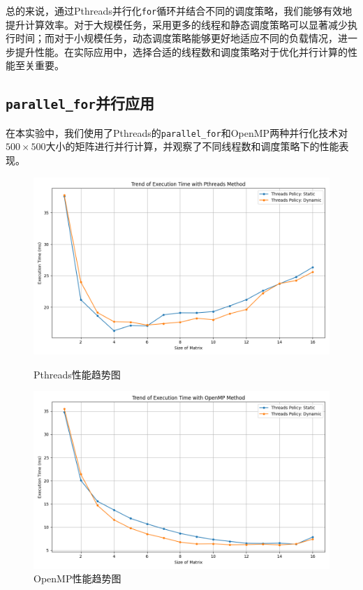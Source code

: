 \documentclass[a4paper, utf8]{ctexart}
\begin{document}
	总的来说，通过Pthreads并行化\verb|for|循环并结合不同的调度策略，我们能够有效地提升计算效率。对于大规模任务，采用更多的线程和静态调度策略可以显著减少执行时间；而对于小规模任务，动态调度策略能够更好地适应不同的负载情况，进一步提升性能。在实际应用中，选择合适的线程数和调度策略对于优化并行计算的性能至关重要。
	
	\subsection{\texttt{parallel\_for}并行应用}
	
	在本实验中，我们使用了Pthreads的\verb|parallel_for|和OpenMP两种并行化技术对$500\times500$大小的矩阵进行并行计算，并观察了不同线程数和调度策略下的性能表现。
	
	\begin{figure}[htbp]
		\centering
		\begin{minipage}{.45\textwidth}
			\centering
			\includegraphics[width=.8\textwidth]{./figure/pthreads_time_trend.png}
			\caption{Pthreads性能趋势图}
		\end{minipage}
		\begin{minipage}{.45\textwidth}
			\centering
			\includegraphics[width=.8\textwidth]{./figure/openmp_time_trend.png}
			\caption{OpenMP性能趋势图}
		\end{minipage}
	\end{figure}
	
\end{document}
